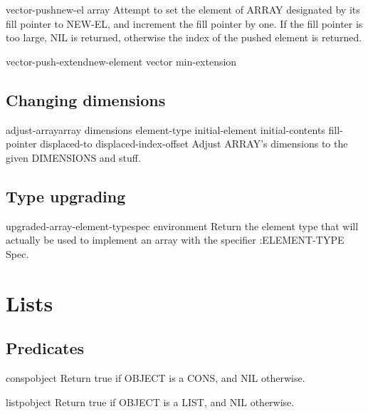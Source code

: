 \documentclass[10pt,english]{book}
\begin{document}
\begin{function}{vector-push}{new-el array}
  Attempt to set the element of ARRAY designated by its fill pointer
   to NEW-EL, and increment the fill pointer by one. If the fill pointer is
   too large, NIL is returned, otherwise the index of the pushed element is
   returned.
\end{function}

\begin{function}{vector-push-extend}{new-element vector \op min-extension}
  
\end{function}

\section{Changing dimensions}
\label{sec:changing-dimensions}

\begin{function}{adjust-array}{array dimensions \key element-type initial-element initial-contents
 fill-pointer displaced-to displaced-index-offset}
  Adjust ARRAY's dimensions to the given DIMENSIONS and stuff.
\end{function}

\section{Type upgrading}
\label{sec:type-upgrading}

\begin{function}{upgraded-array-element-type}{spec \op environment}
  Return the element type that will actually be used to implement an array
   with the specifier :ELEMENT-TYPE Spec.
\end{function}


\chapter{Lists}
\label{cha:lists}

\section{Predicates}
\label{sec:list-predicates}

\begin{function}{consp}{object}
  Return true if OBJECT is a CONS, and NIL otherwise.
\end{function}

\begin{function}{listp}{object}
  Return true if OBJECT is a LIST, and NIL otherwise.
\end{function}
\end{document}
